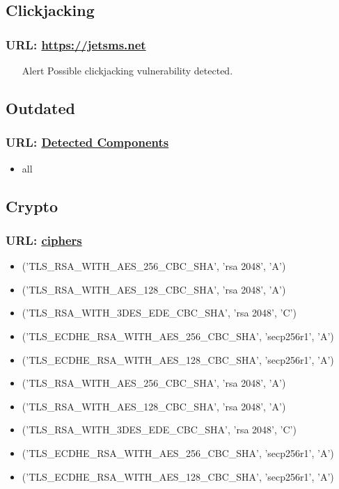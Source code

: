 \documentclass{article}
\begin{document}
\subsection{Clickjacking}

\subsubsection{URL: \url{https://jetsms.net}}
\begin{itemize}
\item [Alert] Possible clickjacking vulnerability detected.
\end{itemize}

\subsection{Outdated}

\subsubsection{URL: \url{Detected Components}}
\begin{itemize}
\item all
\end{itemize}

\subsection{Crypto}

\subsubsection{URL: \url{ciphers}}
\begin{itemize}
\item ('TLS_RSA_WITH_AES_256_CBC_SHA', 'rsa 2048', 'A')
\item ('TLS_RSA_WITH_AES_128_CBC_SHA', 'rsa 2048', 'A')
\item ('TLS_RSA_WITH_3DES_EDE_CBC_SHA', 'rsa 2048', 'C')
\item ('TLS_ECDHE_RSA_WITH_AES_256_CBC_SHA', 'secp256r1', 'A')
\item ('TLS_ECDHE_RSA_WITH_AES_128_CBC_SHA', 'secp256r1', 'A')
\item ('TLS_RSA_WITH_AES_256_CBC_SHA', 'rsa 2048', 'A')
\item ('TLS_RSA_WITH_AES_128_CBC_SHA', 'rsa 2048', 'A')
\item ('TLS_RSA_WITH_3DES_EDE_CBC_SHA', 'rsa 2048', 'C')
\item ('TLS_ECDHE_RSA_WITH_AES_256_CBC_SHA', 'secp256r1', 'A')
\item ('TLS_ECDHE_RSA_WITH_AES_128_CBC_SHA', 'secp256r1', 'A')
\end{itemize}
\end{document}

